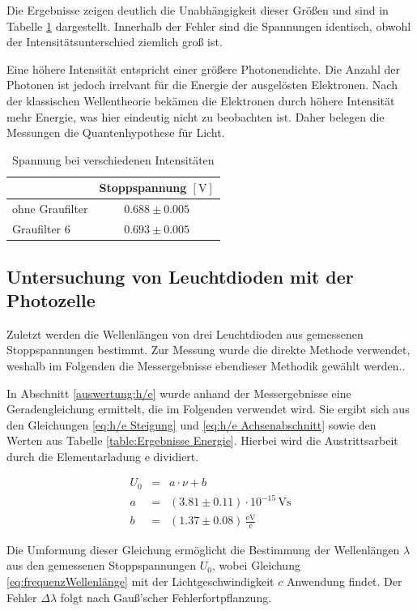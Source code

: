 \documentclass[12pt,a4paper]{scrartcl}
\numberwithin{equation}{section} %
\begin{document}
Die Ergebnisse zeigen deutlich die Unabhängigkeit dieser Größen und sind in Tabelle \ref{tab:Spannung Intensität} dargestellt. Innerhalb der Fehler sind die Spannungen identisch, obwohl der Intensitätsunterschied ziemlich groß ist.

Eine höhere Intensität entspricht einer größere Photonendichte. Die Anzahl der Photonen ist jedoch irrelvant für die Energie der ausgelösten Elektronen. Nach der klassischen Wellentheorie bekämen die Elektronen durch höhere Intensität mehr Energie, was hier eindeutig nicht zu beobachten ist. Daher belegen die Messungen die Quantenhypothese für Licht.

\begin{table}[h!]
	\centering
	\begin{tabular}{l|c}
		& Stoppspannung $[\mathrm{V}]$ \\
		\hline
		ohne Graufilter & $0.688 \pm 0.005$ \\
		Graufilter $6$ & $0.693 \pm 0.005$
	\end{tabular}
	\caption{Spannung bei verschiedenen Intensitäten}
	\label{tab:Spannung Intensität}
\end{table}

\subsection{Untersuchung von Leuchtdioden mit der Photozelle}

Zuletzt werden die Wellenlängen von drei Leuchtdioden aus gemessenen Stoppspannungen bestimmt. Zur Messung wurde die direkte Methode verwendet, weshalb im Folgenden die Messergebnisse ebendieser Methodik gewählt werden..

In Abschnitt \ref{auswertung:h/e} wurde anhand der Messergebnisse eine Geradengleichung ermittelt, die im Folgenden verwendet wird. Sie ergibt sich aus den Gleichungen \eqref{eq:h/e Steigung} und \eqref{eq:h/e Achsenabschnitt} sowie den Werten aus Tabelle \ref{table:Ergebnisse Energie}. Hierbei wird die Austrittsarbeit durch die Elementarladung $\mathrm{e}$ dividiert.

\begin{eqnarray}
	U_0 &=& a \cdot \nu + b \\
	a &=& (3.81\pm 0.11)\cdot10^{-15}\mathrm{\,Vs} \\
	b &=& (1.37 \pm 0.08) \,\frac{\mathrm{eV}}{\mathrm{e}}
\end{eqnarray}

\noindent
Die Umformung dieser Gleichung ermöglicht die Bestimmung der Wellenlängen $\lambda$ aus den gemessenen Stoppspannungen $U_0$, wobei Gleichung \eqref{eq:frequenzWellenlänge} mit der Lichtgeschwindigkeit $c$ Anwendung findet. Der Fehler $\Delta \lambda$ folgt nach Gauß'scher Fehlerfortpflanzung.
\end{document}
